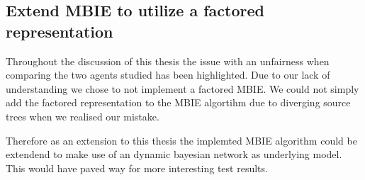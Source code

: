 \subsection{Extend MBIE to utilize a factored representation}
\label{sec:factored_mbie}

Throughout the discussion of this thesis the issue with an unfairness when
comparing the two agents studied has been highlighted. Due to our lack of
understanding we chose to not implement a factored MBIE. We could not simply
add the factored representation to the MBIE algortihm due to diverging source
trees when we realised our mistake.

Therefore as an extension to this thesis the implemted MBIE algorithm could be
extendend to make use of an dynamic bayesian network as underlying model. This
would have paved way for more interesting test results.
